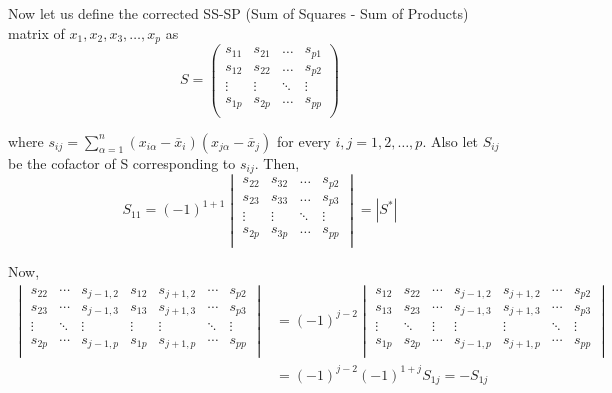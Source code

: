 \documentclass[10pt]{article}
\begin{document}
Now let us define the corrected SS-SP (Sum of Squares - Sum of Products) matrix of $ x_1, x_2, x_3, \ldots, x_p $ as
\[ S = 
\begin{pmatrix}
	s_{11} & s_{21} & \ldots & s_{p1} \\
	s_{12} & s_{22} & \ldots & s_{p2} \\
	\vdots & \vdots & \ddots & \vdots \\
	s_{1p} & s_{2p} & \ldots & s_{pp} \\
\end{pmatrix}\] 

where $ s_{ij} = \sum_{\alpha = 1}^{n} \left( x_{i\alpha} - \bar{x}_i \right) \left( x_{j\alpha} - \bar{x}_j \right) $ for every $ i, j = 1, 2, \ldots, p$.
Also let $ S_{ij} $ be the cofactor of S corresponding to $ s_{ij} $.
Then,
\[ S_{11} = (-1)^{1+1} 
\begin{vmatrix}
	s_{22} & s_{32} & \ldots & s_{p2} \\
	s_{23} & s_{33} & \ldots & s_{p3} \\
	\vdots & \vdots & \ddots & \vdots \\
	s_{2p} & s_{3p} & \ldots & s_{pp} \\
\end{vmatrix} = |S^{*}| \]

Now, 
\begin{align*}
\begin{vmatrix}
	s_{22} & \cdots & s_{j-1,2} & s_{12} & s_{j+1, 2} & \cdots & s_{p2} \\
	s_{23} & \cdots & s_{j-1,3} & s_{13} & s_{j+1, 3} & \cdots & s_{p3} \\
	\vdots & \ddots & \vdots & \vdots & \vdots & \ddots & \vdots \\
	s_{2p} & \cdots & s_{j-1,p} & s_{1p} & s_{j+1, p} & \cdots & s_{pp} \\
\end{vmatrix} &= (-1)^{j-2} 
\begin{vmatrix}
	s_{12} & s_{22} & \cdots & s_{j-1,2} & s_{j+1, 2} & \cdots & s_{p2} \\
	s_{13} & s_{23} & \cdots & s_{j-1,3} & s_{j+1, 3} & \cdots & s_{p3} \\
	\vdots & \ddots & \vdots & \vdots & \vdots & \ddots & \vdots \\
	s_{1p} & s_{2p} & \cdots & s_{j-1,p} & s_{j+1, p} & \cdots & s_{pp} \\
\end{vmatrix} \\
&= (-1)^{j-2} (-1)^{1+j}S_{1j} = -S_{1j}
\end{align*}
\end{document}
